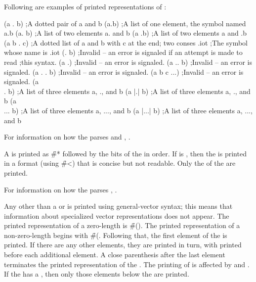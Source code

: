 \goodbreak         
Following are examples of printed representations of :

\code
 (a . b)     ;A dotted pair of a and b
 (a.b)       ;A list of one element, the symbol named a.b
 (a. b)      ;A list of two elements a. and b
 (a .b)      ;A list of two elements a and .b
 (a b . c)   ;A dotted list of a and b with c at the end; two conses
 .iot        ;The symbol whose name is .iot
 (. b)       ;Invalid -- an error is signaled if an attempt is made to read 
             ;this syntax.
 (a .)       ;Invalid -- an error is signaled.
 (a .. b)    ;Invalid -- an error is signaled.
 (a . . b)   ;Invalid -- an error is signaled.
 (a b c ...) ;Invalid -- an error is signaled.
 (a \\. b)    ;A list of three elements a, ., and b
 (a |.| b)   ;A list of three elements a, ., and b
 (a \\... b)  ;A list of three elements a, ..., and b
 (a |...| b) ;A list of three elements a, ..., and b
\endcode

For information on how the  parses  and ,
\seesection\LeftParen. 
     
\endsubsubsection%

A  is printed as \f{\#*} followed by the bits of the 
in order.  If  is , then the  is
printed in a format (using \f{\#<}) that is concise but not readable.
Only the   of the  are printed.


For information on how the  parses ,
\seesection\SharpsignStar.

\endsubsubsection%

Any  
other than a  or  is printed using
general-vector syntax; this means that information
about specialized vector representations does not appear.
The printed representation of a zero-length  
is \f{\#()}.  The
printed representation of a non-zero-length  
begins with \f{\#(}.
Following that, the first element of the  is printed.  If
there are any other elements, they are printed in turn, with 
printed before each additional element.  A close parenthesis
after the
last element terminates the printed representation of the . 
The
printing of  
is affected by  and
.
If the  has a , 
then only those elements below
the  are printed.

